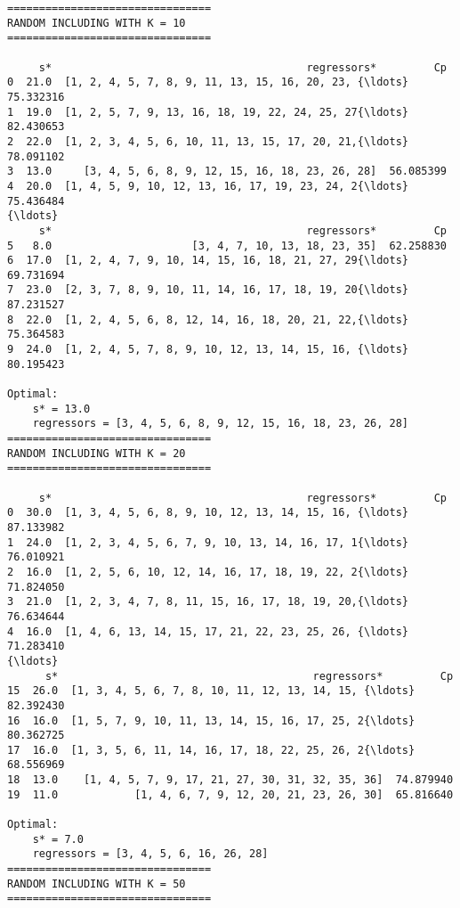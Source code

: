 \documentclass[11pt]{article}
\begin{document}
    \begin{Verbatim}[commandchars=\\\{\}]
================================
RANDOM INCLUDING WITH K = 10
================================

     s*                                        regressors*         Cp
0  21.0  [1, 2, 4, 5, 7, 8, 9, 11, 13, 15, 16, 20, 23, {\ldots}  75.332316
1  19.0  [1, 2, 5, 7, 9, 13, 16, 18, 19, 22, 24, 25, 27{\ldots}  82.430653
2  22.0  [1, 2, 3, 4, 5, 6, 10, 11, 13, 15, 17, 20, 21,{\ldots}  78.091102
3  13.0     [3, 4, 5, 6, 8, 9, 12, 15, 16, 18, 23, 26, 28]  56.085399
4  20.0  [1, 4, 5, 9, 10, 12, 13, 16, 17, 19, 23, 24, 2{\ldots}  75.436484
{\ldots}
     s*                                        regressors*         Cp
5   8.0                      [3, 4, 7, 10, 13, 18, 23, 35]  62.258830
6  17.0  [1, 2, 4, 7, 9, 10, 14, 15, 16, 18, 21, 27, 29{\ldots}  69.731694
7  23.0  [2, 3, 7, 8, 9, 10, 11, 14, 16, 17, 18, 19, 20{\ldots}  87.231527
8  22.0  [1, 2, 4, 5, 6, 8, 12, 14, 16, 18, 20, 21, 22,{\ldots}  75.364583
9  24.0  [1, 2, 4, 5, 7, 8, 9, 10, 12, 13, 14, 15, 16, {\ldots}  80.195423

Optimal:
	s* = 13.0
	regressors = [3, 4, 5, 6, 8, 9, 12, 15, 16, 18, 23, 26, 28]
================================
RANDOM INCLUDING WITH K = 20
================================

     s*                                        regressors*         Cp
0  30.0  [1, 3, 4, 5, 6, 8, 9, 10, 12, 13, 14, 15, 16, {\ldots}  87.133982
1  24.0  [1, 2, 3, 4, 5, 6, 7, 9, 10, 13, 14, 16, 17, 1{\ldots}  76.010921
2  16.0  [1, 2, 5, 6, 10, 12, 14, 16, 17, 18, 19, 22, 2{\ldots}  71.824050
3  21.0  [1, 2, 3, 4, 7, 8, 11, 15, 16, 17, 18, 19, 20,{\ldots}  76.634644
4  16.0  [1, 4, 6, 13, 14, 15, 17, 21, 22, 23, 25, 26, {\ldots}  71.283410
{\ldots}
      s*                                        regressors*         Cp
15  26.0  [1, 3, 4, 5, 6, 7, 8, 10, 11, 12, 13, 14, 15, {\ldots}  82.392430
16  16.0  [1, 5, 7, 9, 10, 11, 13, 14, 15, 16, 17, 25, 2{\ldots}  80.362725
17  16.0  [1, 3, 5, 6, 11, 14, 16, 17, 18, 22, 25, 26, 2{\ldots}  68.556969
18  13.0    [1, 4, 5, 7, 9, 17, 21, 27, 30, 31, 32, 35, 36]  74.879940
19  11.0            [1, 4, 6, 7, 9, 12, 20, 21, 23, 26, 30]  65.816640

Optimal:
	s* = 7.0
	regressors = [3, 4, 5, 6, 16, 26, 28]
================================
RANDOM INCLUDING WITH K = 50
================================


\end{Verbatim}
\end{document}
